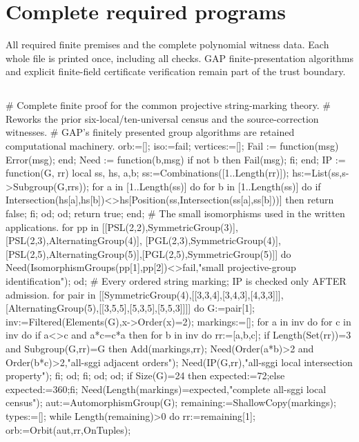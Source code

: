 \documentclass[11pt,a4paper]{article}
\begin{document}
\section*{Complete required programs}
All required finite premises and the complete polynomial witness data. Each whole file is printed once, including all checks. GAP finite-presentation algorithms and explicit finite-field certificate verification remain part of the trust boundary.
\subsection*{\texorpdfstring{}{required finite.g}}
\begin{CompleteProgram}
# Complete finite proof for the common projective string-marking theory.
# Reworks the prior six-local/ten-universal census and the source-correction witnesses.
# GAP's finitely presented group algorithms are retained computational machinery.
orb:=[]; iso:=fail; vertices:=[];
Fail := function(msg) Error(msg); end;
Need := function(b,msg) if not b then Fail(msg); fi; end;
IP := function(G, rr)
  local ss, hs, a,b;
  ss:=Combinations([1..Length(rr)]);
  hs:=List(ss,s->Subgroup(G,rr{s}));
  for a in [1..Length(ss)] do for b in [1..Length(ss)] do
    if Intersection(hs[a],hs[b])<>hs[Position(ss,Intersection(ss[a],ss[b]))] then return false; fi;
  od; od; return true;
end;
# The small isomorphisms used in the written applications.
for pp in [[PSL(2,2),SymmetricGroup(3)],[PSL(2,3),AlternatingGroup(4)],
           [PGL(2,3),SymmetricGroup(4)],[PSL(2,5),AlternatingGroup(5)],[PGL(2,5),SymmetricGroup(5)]] do
  Need(IsomorphismGroups(pp[1],pp[2])<>fail,"small projective-group identification");
od;
# Every ordered string marking; IP is checked only AFTER admission.
for pair in [[SymmetricGroup(4),[[3,3,4],[3,4,3],[4,3,3]]],
             [AlternatingGroup(5),[[3,5,5],[5,3,5],[5,5,3]]]] do
  G:=pair[1]; inv:=Filtered(Elements(G),x->Order(x)=2); markings:=[];
  for a in inv do for c in inv do if a<>c and a*c=c*a then
    for b in inv do rr:=[a,b,c];
      if Length(Set(rr))=3 and Subgroup(G,rr)=G then
        Add(markings,rr);
        Need(Order(a*b)>2 and Order(b*c)>2,"all-sggi adjacent orders");
        Need(IP(G,rr),"all-sggi local intersection property");
      fi;
    od;
  fi; od; od;
  if Size(G)=24 then expected:=72;else expected:=360;fi;
  Need(Length(markings)=expected,"complete all-sggi local census");
  aut:=AutomorphismGroup(G); remaining:=ShallowCopy(markings); types:=[];
  while Length(remaining)>0 do
    rr:=remaining[1]; orb:=Orbit(aut,rr,OnTuples);

\end{CompleteProgram}
\end{document}
